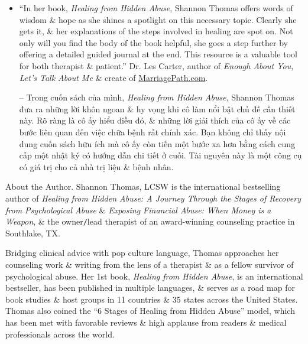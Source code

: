 \documentclass{article}
\begin{document}
\begin{enumerate}
\begin{itemize}
		-- Rất ít nhà văn có thể kết nối nghiên cứu, kinh nghiệm, \& hiểu biết trực quan như {\sc Shannon Thomas} đã làm trong cuốn sách mới mang tính đột phá của mình dành cho những người sống sót sau chấn thương tâm lý \& tâm lý. Trong {\it Healing from Hidden Abuse}, bạn sẽ không chỉ tìm thấy bằng chứng về chuyên môn của {\sc Shannon} với tư cách là một nhà trị liệu đã làm việc với những khách hàng bị tổn thương do lạm dụng tâm lý bí mật, mà còn cả khả năng thông thạo mạnh mẽ của cô ấy về những điều quan trọng những câu hỏi cần thiết để vượt qua tổn thương \& chữa lành.
		
		\item ``In her book, {\it Healing from Hidden Abuse}, {\sc Shannon Thomas} offers words of wisdom \& hope as she shines a spotlight on this necessary topic. Clearly she gets it, \& her explanations of the steps involved in healing are spot on. Not only will you find the body of the book helpful, she goes a step further by offering a detailed guided journal at the end. This resource is a valuable tool for both therapist \& patient.'' Dr. {\sc Les Carter}, author of {\it Enough About You, Let's Talk About Me} \& create of \url{MarriagePath.com}.
		
		-- Trong cuốn sách của mình, {\it Healing from Hidden Abuse}, {\sc Shannon Thomas} đưa ra những lời khôn ngoan \& hy vọng khi cô làm nổi bật chủ đề cần thiết này. Rõ ràng là cô ấy hiểu điều đó, \& những lời giải thích của cô ấy về các bước liên quan đến việc chữa bệnh rất chính xác. Bạn không chỉ thấy nội dung cuốn sách hữu ích mà cô ấy còn tiến một bước xa hơn bằng cách cung cấp một nhật ký có hướng dẫn chi tiết ở cuối. Tài nguyên này là một công cụ có giá trị cho cả nhà trị liệu \& bệnh nhân.
	\end{itemize}
	{\sf About the Author.} {\sc Shannon Thomas, LCSW} is the international bestselling author of {\it Healing from Hidden Abuse: A Journey Through the Stages of Recovery from Psychological Abuse} \& {\it Exposing Financial Abuse: When Money is a Weapon}, \& the owner{\tt/}lead therapist of an award-winning counseling practice in Southlake, TX.
	
	Bridging clinical advice with pop culture language, {\sc Thomas} approaches her counseling work \& writing from the lens of a therapist \& as a fellow survivor of psychological abuse. Her 1st book, {\it Healing from Hidden Abuse}, is an international bestseller, has been published in multiple languages, \& serves as a road map for book studies \& host groups in 11 countries \& 35 states across the United States. {\sc Thomas} also coined the ``6 Stages of Healing from Hidden Abuse'' model, which has been met with favorable reviews \& high applause from readers \& medical professionals across the world.
	

\end{enumerate}
\end{document}
